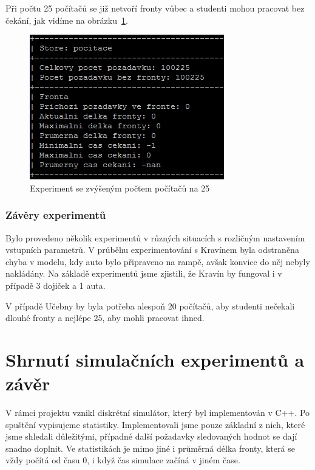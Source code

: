 \documentclass[12pt,a4paper,titlepage,final]{article}
\begin{document}
Při počtu 25 počítačů se již netvoří fronty vůbec a studenti mohou pracovat bez čekání, jak vidíme na obrázku~\ref{obr5}.

\begin{figure}[!h] 
 	\centering
	 \includegraphics[]{ucebna3.jpg} 
\caption{Experiment se zvýšeným počtem počítačů na 25}
\label{obr5}
\end{figure}

\subsubsection{Závěry experimentů}

Bylo provedeno několik experimentů v různých situacích s rozličným nastavením vstupních parametrů. V průběhu experimentování s Kravínem byla odstraněna chyba v modelu, kdy auto bylo připraveno na rampě,  avšak konvice do něj nebyly nakládány.  Na základě experimentů jsme zjistili, že Kravín by fungoval i v případě 3 dojiček a 1 auta.

V případě Učebny by byla potřeba alespoň 20 počítačů, aby studenti nečekali dlouhé fronty a nejlépe 25, aby mohli pracovat ihned.


\section{Shrnutí simulačních experimentů a závěr}

V rámci projektu vznikl diskrétní simulátor, který byl implementován v C++. Po spuštění vypisujeme statistiky. Implementovali jsme pouze základní z nich, které jsme shledali důležitými, případné další požadavky sledovaných hodnot se dají snadno doplnit.
Ve statistikách je mimo jiné i průměrná délka fronty, která se vždy počítá od času 0, i když čas simulace začíná v jiném čase.
\end{document}
